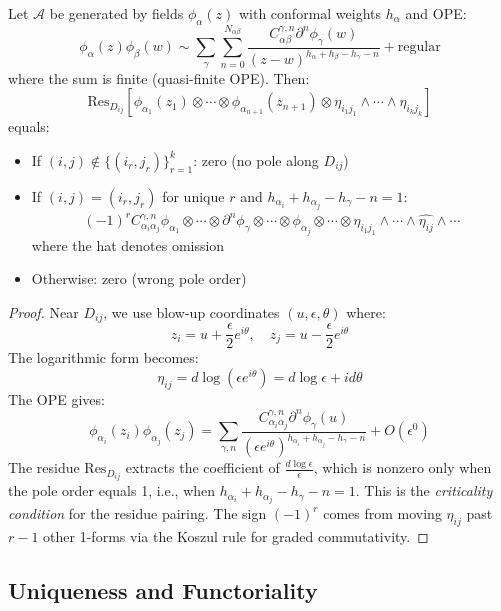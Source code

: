 \begin{theorem}\label{thm:residue-formula}
Let $\mathcal{A}$ be generated by fields $\phi_\alpha(z)$ with conformal weights $h_\alpha$ and OPE:
\[
\phi_\alpha(z)\phi_\beta(w) \sim \sum_{\gamma} \sum_{n=0}^{N_{\alpha\beta}} 
\frac{C^{\gamma,n}_{\alpha\beta} \partial^n\phi_\gamma(w)}{(z-w)^{h_\alpha + h_\beta - h_\gamma - n}}
+ \text{regular}
\]
where the sum is finite (quasi-finite OPE). Then:
\[
\text{Res}_{D_{ij}}[\phi_{\alpha_1}(z_1) \otimes \cdots \otimes \phi_{\alpha_{n+1}}(z_{n+1}) 
\otimes \eta_{i_1j_1} \wedge \cdots \wedge \eta_{i_kj_k}]
\]
equals:
\begin{itemize}
\item If $(i,j) \notin \{(i_r, j_r)\}_{r=1}^k$: zero (no pole along $D_{ij}$)
\item If $(i,j) = (i_r, j_r)$ for unique $r$ and $h_{\alpha_i} + h_{\alpha_j} - h_\gamma - n = 1$:
\[
(-1)^r C^{\gamma,n}_{\alpha_i\alpha_j} \phi_{\alpha_1} \otimes \cdots \otimes \partial^n\phi_\gamma \otimes \cdots 
\otimes \widehat{\phi_{\alpha_j}} \otimes \cdots \otimes \eta_{i_1j_1} \wedge \cdots \wedge \widehat{\eta_{ij}} \wedge \cdots
\]
where the hat denotes omission
\item Otherwise: zero (wrong pole order)
\end{itemize}
\end{theorem}
 
\begin{proof}
Near $D_{ij}$, we use blow-up coordinates $(u, \epsilon, \theta)$ where:
\[
z_i = u + \frac{\epsilon}{2}e^{i\theta}, \quad z_j = u - \frac{\epsilon}{2}e^{i\theta}
\]
The logarithmic form becomes:
\[
\eta_{ij} = d\log(\epsilon e^{i\theta}) = d\log\epsilon + id\theta
\]
The OPE gives:
\[
\phi_{\alpha_i}(z_i)\phi_{\alpha_j}(z_j) = \sum_{\gamma,n} 
\frac{C^{\gamma,n}_{\alpha_i\alpha_j} \partial^n\phi_\gamma(u)}{(\epsilon e^{i\theta})^{h_{\alpha_i} + h_{\alpha_j} - h_\gamma - n}}
+ O(\epsilon^0)
\]
The residue $\text{Res}_{D_{ij}}$ extracts the coefficient of $\frac{d\log\epsilon}{\epsilon}$, which is 
nonzero only when the pole order equals 1, i.e., when $h_{\alpha_i} + h_{\alpha_j} - h_\gamma - n = 1$. This is the 
\emph{criticality condition} for the residue pairing. The sign $(-1)^r$ comes from 
moving $\eta_{ij}$ past $r-1$ other 1-forms via the Koszul rule for graded
commutativity.
\end{proof}
 
\subsection{Uniqueness and Functoriality}
 
